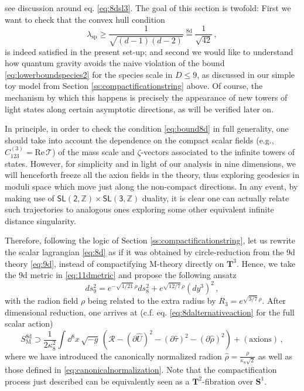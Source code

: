 see discussion around eq. \eqref{eq:8dsl3}. The goal of this section is twofold: First we want to check that the convex hull condition 
%
\begin{equation} \label{eq:bound8d}
  \lambda_{\text{sp}} \geq \frac{1}{\sqrt{(d-1)(d-2)}} \stackrel{\text{8d}}{=} \frac{1}{\sqrt{42}}\, ,
\end{equation}
%
is indeed satisfied in the present set-up; and second we would like to understand how quantum gravity avoids the naive violation of the bound \eqref{eq:lowerboundspecies2} for the species scale in $D\leq9$, as discussed in our simple toy model from Section \ref{ss:compactificationstring} above. Of course, the mechanism by which this happens is precisely the appearance of new towers of light states along certain asymptotic directions, as will be verified later on. 

In principle, in order to check the condition \eqref{eq:bound8d} in full generality, one should take into account the dependence on the compact scalar fields (e.g., $ C_{123}^{(3)}= \text{Re}\, \mathcal{T}$) of the mass scale and $\zeta$-vectors associated to the infinite towers of states. However, for simplicity and in light of our analysis in nine dimensions, we will henceforth freeze all the axion fields in the theory, thus exploring geodesics in moduli space which move just along the non-compact directions. In any event, by making use of $\mathsf{SL(2, \mathbb{Z})} \times \mathsf{SL(3, \mathbb{Z})}$ duality, it is clear one can actually relate such trajectories to analogous ones exploring some other equivalent infinite distance singularity.

Therefore, following the logic of Section \ref{ss:compactificationstring}, let us rewrite the scalar lagrangian \eqref{eq:8d} as if it was obtained by circle-reduction from the 9d theory \eqref{eq:9d}, instead of compactifying M-theory directly on $\mathbf{T}^3$. Hence, we take the 9d metric in \eqref{eq:11dmetric} and propose the following ansatz
%
\begin{equation}\label{eq:9dmetric}
	ds^2_{9} = e^{-\sqrt{1/21}\,\rho} ds_8^2 + e^{\sqrt{12/7}\,\rho} \left(dy^3 \right)^2\, ,
\end{equation}
%
with the radion field $\rho$ being related to the extra radius by $R_3=e^{\sqrt{3/7}\,\rho}$. After dimensional reduction, one arrives at (c.f. eq. \eqref{eq:8dalternativeaction} for the full scalar action) 
%
\begin{equation}\label{eq:8dcanonical}
	S^{\text{8d}}_{\text{M}} \supset \frac{1}{2\kappa_8^2} \int \dd^{8}x\, \sqrt{-g}\,  \left( \mathcal{R} - \left( \partial \hat U \right)^2 - \left(\partial \hat \tau\right)^2 - \left( \partial \hat \rho \right)^2 \right) + \left( \text{axions} \right)\, ,
\end{equation}
%
where we have introduced the canonically normalized radion $\hat \rho=\frac{\rho}{\kappa_8 \sqrt{2}}$ as well as those defined in \eqref{eq:canonicalnormalization}. Note that the compactification process just described can be equivalently seen as a $\mathbf{T}^2$-fibration over $\mathbf{S}^1$.

